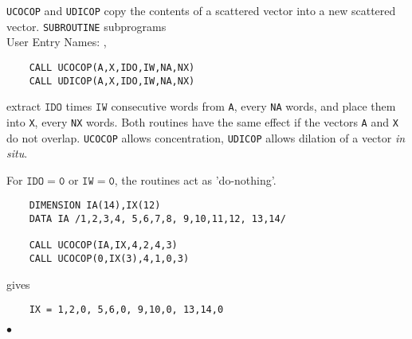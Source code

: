                             
                          
                      
        
{\tt UCOCOP} and {\tt UDICOP} copy the contents of a scattered vector
into a new scattered vector.
\Structure
{\tt SUBROUTINE} subprograms \\
User Entry Names: , 
\Usage
\begin{verbatim}
    CALL UCOCOP(A,X,IDO,IW,NA,NX)
    CALL UDICOP(A,X,IDO,IW,NA,NX)
\end{verbatim}
extract $\mathtt{IDO}$ times $\mathtt{IW}$
consecutive words from {\tt A},
every {\tt NA} words, and place them into {\tt X}, every {\tt NX} words.
Both routines have the same effect if the vectors {\tt A} and {\tt X}
do not overlap. {\tt UCOCOP} allows concentration,
{\tt UDICOP} allows dilation of a vector {\it in situ}.
\par
For $\mathtt{IDO=0}$ or $\mathtt{IW=0}$, the routines act as
'do-nothing'.
\Examples
\begin{verbatim}
    DIMENSION IA(14),IX(12)
    DATA IA /1,2,3,4, 5,6,7,8, 9,10,11,12, 13,14/
 
    CALL UCOCOP(IA,IX,4,2,4,3)
    CALL UCOCOP(0,IX(3),4,1,0,3)
\end{verbatim}
gives
\begin{verbatim}
    IX = 1,2,0, 5,6,0, 9,10,0, 13,14,0
\end{verbatim}
$\bullet$
